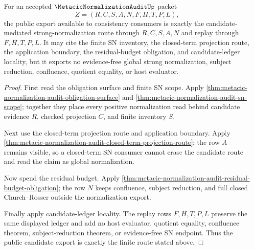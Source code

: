 \begin{theorem}
\label{thm:metacic-normalization-audit-public-candidate-export}
For an accepted $\MetacicNormalizationAuditUp$ packet
$$
Z=(R,C,S,A,N,F,H,T,P,L),
$$
the public export available to consistency consumers is exactly the candidate-mediated strong-normalization route through $R,C,S,A,N$ and replay through $F,H,T,P,L$. It may cite the finite SN inventory, the closed-term projection route, the application boundary, the residual-budget obligation, and candidate-ledger locality, but it exports no evidence-free global strong normalization, subject reduction, confluence, quotient equality, or host evaluator.
\end{theorem}
\begin{proof}
First read the obligation surface and finite SN scope. Apply \autoref{thm:metacic-normalization-audit-obligation-surface} and \autoref{thm:metacic-normalization-audit-sn-scope}; together they place every positive normalization read behind candidate evidence $R$, checked projection $C$, and finite inventory $S$.

Next use the closed-term projection route and application boundary. Apply \autoref{thm:metacic-normalization-audit-closed-term-projection-route}; the row $A$ remains visible, so a closed-term SN consumer cannot erase the candidate route and read the claim as global normalization.

Now spend the residual budget. Apply \autoref{thm:metacic-normalization-audit-residual-budget-obligation}; the row $N$ keeps confluence, subject reduction, and full closed Church--Rosser outside the normalization export.

Finally apply candidate-ledger locality. The replay rows $F,H,T,P,L$ preserve the same displayed ledger and add no host evaluator, quotient equality, confluence theorem, subject-reduction theorem, or evidence-free SN endpoint. Thus the public candidate export is exactly the finite route stated above.
\end{proof}

